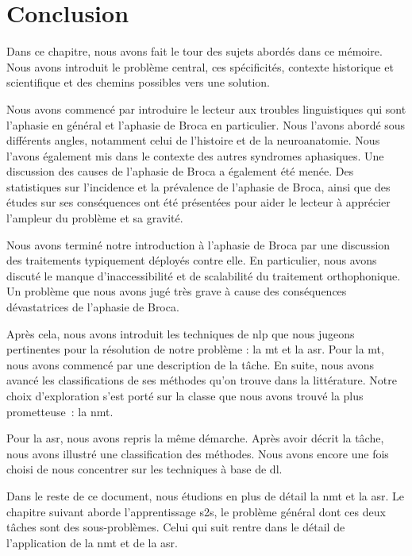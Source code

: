 \section{Conclusion}

Dans ce chapitre, nous avons fait le tour des sujets abordés dans ce mémoire.
Nous avons introduit le problème central, ces spécificités, contexte historique et scientifique 
et des chemins possibles vers une solution.

Nous avons commencé par introduire le lecteur aux troubles linguistiques qui sont 
l'aphasie en général et l'aphasie de Broca en particulier.
Nous l'avons abordé sous différents angles, notamment celui de l'histoire et de la neuroanatomie.
Nous l'avons également mis dans le contexte des autres syndromes aphasiques.
Une discussion des causes de l'aphasie de Broca a également été menée.
Des statistiques sur l'incidence et la prévalence de l'aphasie de Broca,
ainsi que des études sur ses conséquences ont été présentées
pour aider le lecteur à apprécier l'ampleur du problème et sa gravité.

Nous avons terminé notre introduction à l'aphasie de Broca 
par une discussion des traitements typiquement déployés contre elle.
En particulier, nous avons discuté le manque d'inaccessibilité et de scalabilité du traitement orthophonique.
Un problème que nous avons jugé très grave à cause des conséquences dévastatrices de l'aphasie de Broca.

Après cela, nous avons introduit les techniques de \gls{nlp} que nous jugeons pertinentes
pour la résolution de notre problème : la \gls{mt} et la \gls{asr}.
Pour la \gls{mt}, nous avons commencé par une description de la tâche.
En suite, nous avons avancé les classifications de ses méthodes qu'on trouve dans la littérature.
Notre choix d'exploration s'est porté sur la classe que nous avons trouvé la plus prometteuse~:
la \gls{nmt}.

Pour la \gls{asr}, nous avons repris la même démarche.
Après avoir décrit la tâche, nous avons illustré une classification des méthodes.
Nous avons encore une fois choisi de nous concentrer sur les techniques à base de \gls{dl}.

Dans le reste de ce document, nous étudions en plus de détail la \gls{nmt} et la \gls{asr}.
Le chapitre suivant aborde l'apprentissage \gls{s2s}, 
le problème général dont ces deux tâches sont des sous-problèmes.
Celui qui suit rentre dans le détail de l'application de la \gls{nmt} et de la \gls{asr}.
